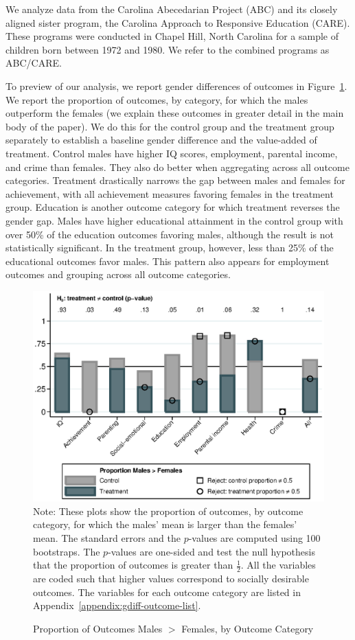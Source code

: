 We analyze data from the Carolina Abecedarian Project (ABC) and its closely aligned sister program, the Carolina Approach to Responsive Education (CARE). These programs were conducted in Chapel Hill, North Carolina for a sample of children born between 1972 and 1980. We refer to the combined programs as ABC/CARE.

To preview of our analysis, we report gender differences of outcomes in Figure~\ref{fig:proportion}. We report the proportion of outcomes, by category, for which the males outperform the females (we explain these outcomes in greater detail in the main body of the paper). We do this for the control group and the treatment group separately to establish a baseline gender difference and the value-added of treatment. Control males have higher IQ scores, employment, parental income, and crime than females. They also do better when aggregating across all outcome categories. Treatment drastically narrows the gap between males and females for achievement, with all achievement measures favoring females in the treatment group. Education is another outcome category for which treatment reverses the gender gap. Males have higher educational attainment in the control group with over 50\% of the education outcomes favoring males, although the result is not statistically significant. In the treatment group, however, less than 25\% of the educational outcomes favor males. This pattern also appears for employment outcomes and grouping across all outcome categories. 

\begin{figure}[!htbp]
\centering
\caption{Proportion of Outcomes Males $>$ Females, by Outcome Category}
\label{fig:proportion}
	\includegraphics[width=\textwidth]{output/gendergaps-treat-vs-fullcontrol}
\footnotesize \justify
Note: These plots show the proportion of outcomes, by outcome category, for which the males' mean is larger than the females' mean. The standard errors and the $p$-values are computed using 100 bootstraps. The $p$-values are one-sided and test the null hypothesis that the proportion of outcomes is greater than $\frac{1}{2}$. All the variables are coded such that higher values correspond to socially desirable outcomes. The variables for each outcome category are listed in Appendix~\ref{appendix:gdiff-outcome-list}.
\end{figure}

